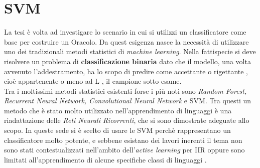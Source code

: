  
 
 
 
 
 
 \chapter{SVM} 
\label{cap:cinque}
La tesi è volta ad investigare lo scenario in cui si utilizzi un classificatore come base per costruire un Oracolo. Da quest esigenza nasce la necessità di utilizzare uno dei tradizionali metodi statistici di \textit{machine learning}. Nella fattispecie si deve risolvere un problema di \textbf{classificazione binaria} dato che il modello, una volta avvenuto l'addestramento, ha lo scopo di predire come accettante o rigettante , cioè appartenente o meno ad \ac{L} , il campione sotto esame.\\
Tra i moltissimi metodi statistici esistenti forse i più noti sono \textit{Random Forest, Recurrent Neural Network, Convolutional Neural Network} e \ac{SVM}. Tra questi un metodo che è stato molto utilizzato nell'apprendimento di linguaggi è una riadattazione delle \textit{Reti Neurali Ricorrenti}, che si sono dimostrate adeguate allo scopo. In queste sede si è scelto di usare le \ac{SVM} perchè rappresentano un classificatore molto potente, e sebbene esistano dei lavori inerenti il tema \cite{Kontorovich09} non sono stati contestualizzati nell'ambito dell'\textit{active learning} per \ac{IIR} oppure sono limitati all'apprendimento di alcune specifiche classi di linguaggi \cite{Cortes08} \cite{Clark06} \cite{Clark11}.

